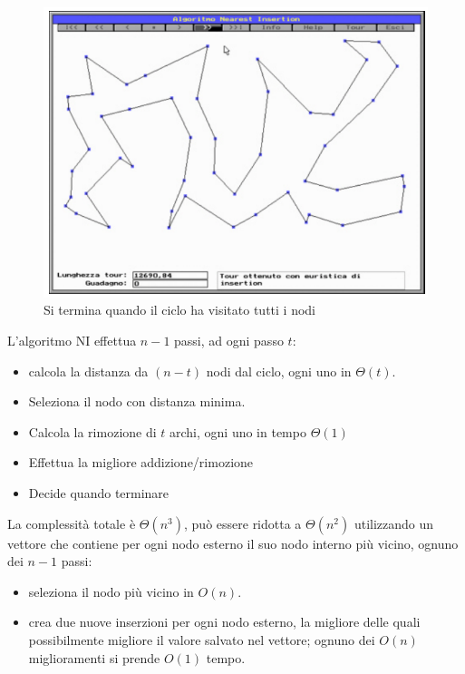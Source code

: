 \documentclass{article}
\begin{document}
    \begin{figure}[H]
        \centering
        \includegraphics[scale=0.5]{images/NI3.png}
        \caption{Si termina quando il ciclo ha visitato tutti i nodi}
    \end{figure}

    L'algoritmo NI effettua $n-1$ passi, ad ogni passo $t$:
    \begin{itemize}
        \item calcola la distanza da $(n-t)$ nodi dal ciclo, ogni uno in $\Theta(t)$.
        \item Seleziona il nodo con distanza minima.
        \item Calcola la rimozione di $t$ archi, ogni uno in tempo $\Theta (1)$
        \item Effettua la migliore addizione/rimozione
        \item Decide quando terminare
    \end{itemize}
    La complessità totale è $\Theta(n^3)$, può essere ridotta a $\Theta(n^2)$ utilizzando un vettore
    che contiene per ogni nodo esterno il suo nodo interno più vicino, ognuno dei $n-1$ passi:
    \begin{itemize}
        \item seleziona il nodo più vicino in $O(n)$.
        \item crea due nuove inserzioni per ogni nodo esterno, la migliore delle quali possibilmente migliore il valore
              salvato nel vettore; ognuno dei $O(n)$ miglioramenti si prende $O(1)$ tempo.
    \end{itemize}
\end{document}
